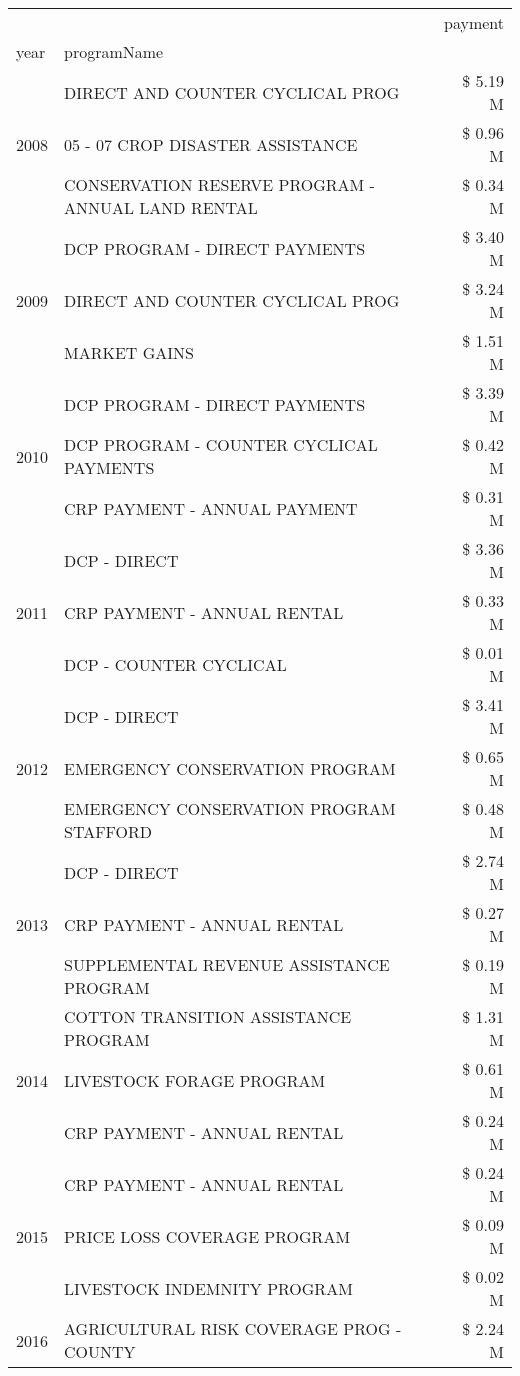 \begin{tabular}{llr}
\toprule
 &  & payment \\
year & programName &  \\
\midrule
\multirow[t]{3}{*}{2008} & DIRECT AND COUNTER CYCLICAL PROG & \$ 5.19 M \\
 & 05 - 07 CROP DISASTER ASSISTANCE & \$ 0.96 M \\
 & CONSERVATION RESERVE PROGRAM - ANNUAL LAND RENTAL & \$ 0.34 M \\
\cline{1-3}
\multirow[t]{3}{*}{2009} & DCP PROGRAM - DIRECT PAYMENTS & \$ 3.40 M \\
 & DIRECT AND COUNTER CYCLICAL PROG & \$ 3.24 M \\
 & MARKET GAINS & \$ 1.51 M \\
\cline{1-3}
\multirow[t]{3}{*}{2010} & DCP PROGRAM - DIRECT PAYMENTS & \$ 3.39 M \\
 & DCP PROGRAM - COUNTER CYCLICAL PAYMENTS & \$ 0.42 M \\
 & CRP PAYMENT - ANNUAL PAYMENT & \$ 0.31 M \\
\cline{1-3}
\multirow[t]{3}{*}{2011} & DCP - DIRECT & \$ 3.36 M \\
 & CRP PAYMENT - ANNUAL RENTAL & \$ 0.33 M \\
 & DCP - COUNTER CYCLICAL & \$ 0.01 M \\
\cline{1-3}
\multirow[t]{3}{*}{2012} & DCP - DIRECT & \$ 3.41 M \\
 & EMERGENCY CONSERVATION PROGRAM & \$ 0.65 M \\
 & EMERGENCY CONSERVATION PROGRAM STAFFORD & \$ 0.48 M \\
\cline{1-3}
\multirow[t]{3}{*}{2013} & DCP - DIRECT & \$ 2.74 M \\
 & CRP PAYMENT - ANNUAL RENTAL & \$ 0.27 M \\
 & SUPPLEMENTAL REVENUE ASSISTANCE PROGRAM & \$ 0.19 M \\
\cline{1-3}
\multirow[t]{3}{*}{2014} & COTTON TRANSITION ASSISTANCE PROGRAM & \$ 1.31 M \\
 & LIVESTOCK FORAGE PROGRAM & \$ 0.61 M \\
 & CRP PAYMENT - ANNUAL RENTAL & \$ 0.24 M \\
\cline{1-3}
\multirow[t]{3}{*}{2015} & CRP PAYMENT - ANNUAL RENTAL & \$ 0.24 M \\
 & PRICE LOSS COVERAGE PROGRAM & \$ 0.09 M \\
 & LIVESTOCK INDEMNITY PROGRAM & \$ 0.02 M \\
\cline{1-3}
\multirow[t]{3}{*}{2016} & AGRICULTURAL RISK COVERAGE PROG - COUNTY & \$ 2.24 M \\

\end{tabular}
